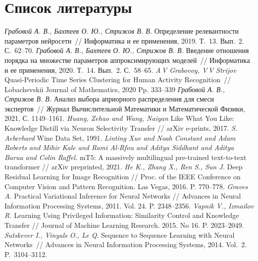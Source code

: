 \newpage

\setcounter{secnumdepth}{0}
\section{Список литературы}
\begingroup
\renewcommand{\section}[2]{}%
\begin{thebibliography}{10}
	\textit{Грабовой А. В., Бахтеев О. Ю., Стрижов В. В.} Определение релевантности параметров нейросети~// Информатика и ее применения, 2019. Т.~13. Вып.~2. С.~62--70.
	\textit{Грабовой А. В., Бахтеев О. Ю., Стрижов В. В.} Введение отношения порядка на множестве параметров аппроксимирующих моделей~// Информатика и ее применения, 2020. Т.~14. Вып.~2. С.~58--65.
	\textit{A\,V Grabovoy, V\,V Strijov} Quasi-Periodic Time Series Clustering for Human Activity Recognition~// Lobachevskii Journal of Mathematics, 2020 Pp. 333--339
	\textit{Грабовой А. В., Стрижов В. В.} Анализ выбора априорного распределения для смеси экспертов~// Журнал Вычислительной Математики и Математической Физики, 2021, С. 1149--1161.
	\textit{{Huang}, Zehao and {Wang}, Naiyan} Like What You Like: Knowledge Distill via Neuron Selectivity Transfer // arXiv e-prints, 2017.
	\textit{S. Aeberhard} Wine Data Set, 1991.
        \textit{Linting Xue and Noah Constant and Adam Roberts and Mihir Kale and Rami Al-Rfou and Aditya Siddhant and Aditya Barua and Colin Raffel.} mT5: A massively multilingual pre-trained text-to-text transformer // arXiv preprinted, 2021.
	\textit{He K., Zhang X., Ren S., Sun J.} Deep Residual Learning for Image Recognition // Proc. of the IEEE Conference on Computer Vision and Pattern Recognition. Las Vegas, 2016. P. 770--778.
	\textit{Graves A.} Practical Variational Inference for Neural Networks // Advances in Neural Information Processing Systems, 2011. Vol. 24. P. 2348--2356.
	\textit{Vapnik V., Izmailov R.} Learning Using Privileged Information: Similarity Control and Knowledge Transfer // Journal of Machine Learning Research. 2015. No 16. P. 2023--2049.	
	\textit{Sutskever I., Vinyals O., Le Q.} Sequence to Sequence Learning with Neural Networks~// Advances in Neural Information Processing Systems, 2014. Vol.~2. P.~3104--3112.

\end{thebibliography}
